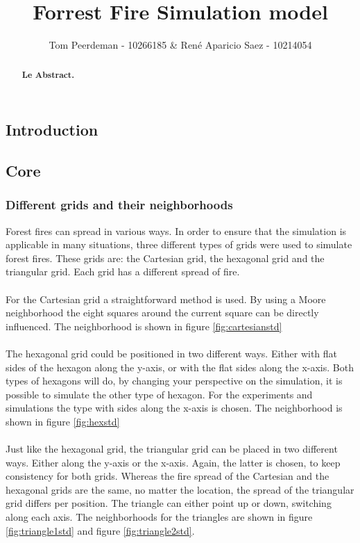 \documentclass{article}
\title{Forrest Fire Simulation model}
\author{Tom Peerdeman - 10266185 \& Ren\'e Aparicio Saez - 10214054}
\begin{document}
\maketitle

\begin{abstract}
\textbf{Le Abstract.}
\end{abstract}

\begin{multicols}{2}
\subsection*{Introduction}

\subsection*{Core}
\subsubsection*{Different grids and their neighborhoods}
Forest fires can spread in various ways. In order to ensure that the simulation is applicable in many situations, three different types of grids were used to simulate forest fires. These grids are: the Cartesian grid, the hexagonal grid and the triangular grid. Each grid has a different spread of fire.\\\\
For the Cartesian grid a straightforward method is used. By using a Moore neighborhood the eight squares around the current square can be directly influenced. The neighborhood is shown in figure \ref{fig:cartesianstd}\\\\
The hexagonal grid could be positioned in two different ways. Either with flat sides of the hexagon along the y-axis, or with the flat sides along the x-axis. Both types of hexagons will do, by changing your perspective on the simulation, it is possible to simulate the other type of hexagon. For the experiments and simulations the type with sides along the x-axis is chosen. The neighborhood is shown in figure \ref{fig:hexstd}\\\\
Just like the hexagonal grid, the triangular grid can be placed in two different ways. Either along the y-axis or the x-axis. Again, the latter is chosen, to keep consistency for both grids. Whereas the fire spread of the Cartesian and the hexagonal grids are the same, no matter the location, the spread of the triangular grid differs per position. The triangle can either point up or down, switching along each axis. The neighborhoods for the triangles are shown in figure \ref{fig:triangle1std} and figure \ref{fig:triangle2std}.

\end{multicols}
\end{document}

